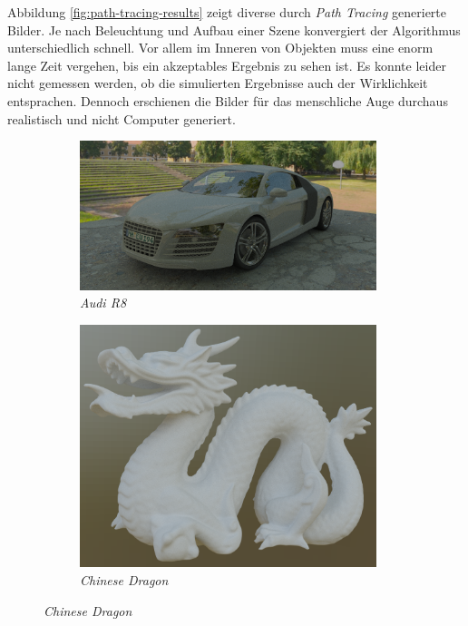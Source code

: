 \documentclass[crop=false]{standalone}
\begin{document}
      Abbildung \ref{fig:path-tracing-results} zeigt diverse durch \textit{Path Tracing} generierte Bilder.
      Je nach Beleuchtung und Aufbau einer Szene konvergiert der Algorithmus unterschiedlich schnell.
      Vor allem im Inneren von Objekten muss eine enorm lange Zeit vergehen, bis ein akzeptables Ergebnis zu sehen ist.
      Es konnte leider nicht gemessen werden, ob die simulierten Ergebnisse auch der Wirklichkeit entsprachen.
      Dennoch erschienen die Bilder für das menschliche Auge durchaus realistisch und nicht Computer generiert.
      \begin{figure}[h]
        \center
        \begin{subfigure}[b]{0.613\textwidth}
          \center
          \includegraphics[width=0.95\textwidth]{images/path_tracing-audi_r8.png}
          \caption{\textit{Audi R8}}
        \end{subfigure}
        \begin{subfigure}[b]{0.38\textwidth}
          \center
          \includegraphics[width=0.95\textwidth]{images/path_tracing-dragon.png}
          \caption{\textit{Chinese Dragon}}
        \end{subfigure}


\end{figure}
\end{document}
